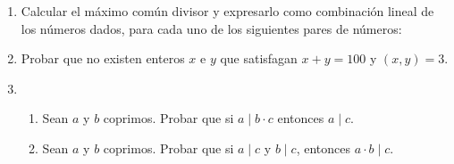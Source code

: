 \documentclass[a4paper,12pt,twoside,spanish,reqno]{amsbook}
\numberwithin{equation}{section}
\begin{document}
\begin{enumerate}
\item Calcular el máximo común divisor y expresarlo como combinación lineal de los números dados, para cada uno de  los siguientes pares de números:




\item Probar que no existen enteros $x$ e $y$ que satisfagan $x+y=100$ y $(x,y)=3$.


\item %
    \begin{enumerate}
        \item Sean $a$ y $b$ coprimos. Probar que si $a\mid b\cdot c$ entonces $a \mid c$.
        \item Sean $a$ y $b$ coprimos. Probar que si $a \mid c$ y $b \mid c$, entonces $a\cdot b \mid c$.
    \end{enumerate}



\end{enumerate}
\end{document}
